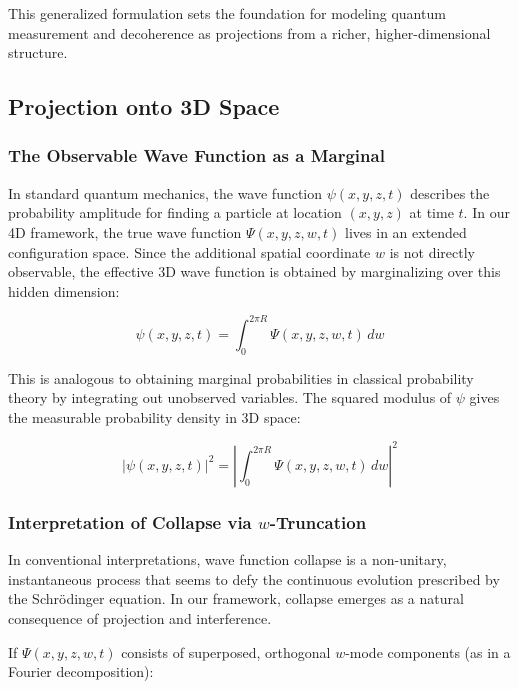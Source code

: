 \documentclass[12pt]{article}
\begin{document}
This generalized formulation sets the foundation for modeling quantum measurement and decoherence as projections from a richer, higher-dimensional structure.

\subsection{Projection onto 3D Space}

\subsubsection{The Observable Wave Function as a Marginal}

In standard quantum mechanics, the wave function \( \psi(x, y, z, t) \) describes the probability amplitude for finding a particle at location \( (x, y, z) \) at time \( t \). In our 4D framework, the true wave function \( \Psi(x, y, z, w, t) \) lives in an extended configuration space. Since the additional spatial coordinate \( w \) is not directly observable, the effective 3D wave function is obtained by marginalizing over this hidden dimension:

\begin{equation}
\psi(x, y, z, t) = \int_{0}^{2\pi R} \Psi(x, y, z, w, t) \, dw
\label{eq:marginal}
\end{equation}

This is analogous to obtaining marginal probabilities in classical probability theory by integrating out unobserved variables. The squared modulus of \( \psi \) gives the measurable probability density in 3D space:

\begin{equation}
|\psi(x, y, z, t)|^2 = \left| \int_{0}^{2\pi R} \Psi(x, y, z, w, t) \, dw \right|^2
\end{equation}

\subsubsection{Interpretation of Collapse via \( w \)-Truncation}

In conventional interpretations, wave function collapse is a non-unitary, instantaneous process that seems to defy the continuous evolution prescribed by the Schrödinger equation. In our framework, collapse emerges as a natural consequence of projection and interference.

If \( \Psi(x, y, z, w, t) \) consists of superposed, orthogonal \( w \)-mode components (as in a Fourier decomposition):
\end{document}
